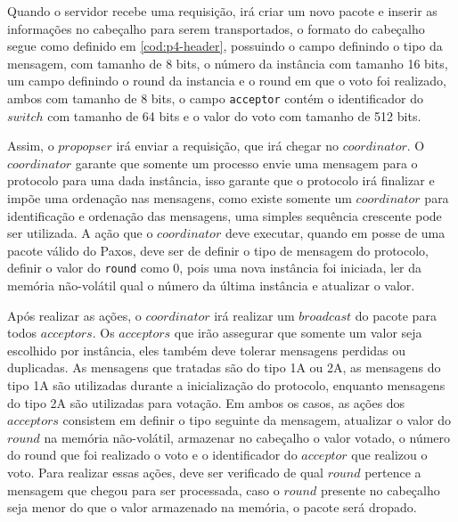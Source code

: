 \documentclass[
    12pt,
    openright, 
    oneside,
    a4paper,
    french,
    english,
    brazil
    ]{facom-ufu-abntex2}
\theoremstyle{definition}
\begin{document}
Quando o servidor recebe uma requisição, irá criar um novo pacote e inserir as informações no
cabeçalho para serem transportados, o formato do cabeçalho segue como definido em \ref{cod:p4-header}, 
possuindo o campo definindo o tipo da mensagem, com tamanho de 8 bits, o número da instância com tamanho 16 bits,
um campo definindo o round da instancia e o round em que o voto foi realizado, ambos com tamanho de
8 bits, o campo \texttt{acceptor} contém o identificador do $switch$ com tamanho de 64 bits e o valor do
voto com tamanho de 512 bits.



Assim, o $propopser$ irá enviar a requisição, que irá chegar no $coordinator$. O $coordinator$ garante que
somente um processo envie uma mensagem para o protocolo para uma dada instância, isso garante 
que o protocolo irá finalizar e impõe uma ordenação nas mensagens, como existe somente um
$coordinator$ para identificação e ordenação das mensagens, uma simples sequência crescente pode ser
utilizada. A ação que o $coordinator$ deve executar, quando em posse de uma pacote válido do Paxos,
deve ser de definir o tipo de mensagem do protocolo, definir o valor do \texttt{round} como 0, pois
uma nova instância foi iniciada, ler da memória não-volátil qual o número da última instância e atualizar
o valor\cite{dang2016paxos}.




Após realizar as ações, o $coordinator$ irá realizar um $broadcast$ do pacote para todos $acceptors$.
Os $acceptors$ que irão assegurar que somente um valor seja escolhido por instância, eles também deve tolerar
mensagens perdidas ou duplicadas. As mensagens que tratadas são do tipo 1A ou 2A, as mensagens do
tipo 1A são utilizadas durante a inicialização do protocolo, enquanto mensagens do tipo 2A são utilizadas
para votação. Em ambos os casos, as ações dos $acceptors$ consistem em definir o tipo seguinte da mensagem,
atualizar o valor do $round$ na memória não-volátil, armazenar no cabeçalho o valor votado, o número do
round que foi realizado o voto e o identificador do $acceptor$ que realizou o voto. Para realizar
essas ações, deve ser verificado de qual $round$ pertence a mensagem que chegou para ser processada,
caso o $round$ presente no cabeçalho seja menor do que o valor armazenado na memória, o pacote será 
dropado\cite{dang2016paxos}.
\end{document}
